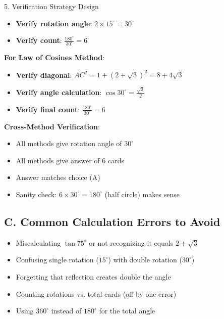 \documentclass[12pt]{article}
\begin{document}
\begin{verificationbox}{5. Verification Strategy Design}
\begin{itemize}
    \item \textbf{Verify rotation angle}: $2 \times 15^\circ = 30^\circ$ \checkmark
    
    \item \textbf{Verify count}: $\frac{180^\circ}{30^\circ} = 6$ \checkmark
\end{itemize}

\textbf{For Law of Cosines Method}:
\begin{itemize}
    \item \textbf{Verify diagonal}: $AC^2 = 1 + (2+\sqrt{3})^2 = 8 + 4\sqrt{3}$ \checkmark
    
    \item \textbf{Verify angle calculation}: $\cos 30^\circ = \frac{\sqrt{3}}{2}$ \checkmark
    
    \item \textbf{Verify final count}: $\frac{180^\circ}{30^\circ} = 6$ \checkmark
\end{itemize}

\textbf{Cross-Method Verification}:
\begin{itemize}
    \item All methods give rotation angle of $30^\circ$ \checkmark
    \item All methods give answer of 6 cards \checkmark
    \item Answer matches choice (A) \checkmark
    \item Sanity check: $6 \times 30^\circ = 180^\circ$ (half circle) makes sense \checkmark
\end{itemize}

\subsection*{C. Common Calculation Errors to Avoid}
\begin{itemize}[leftmargin=*]
    \item Miscalculating $\tan 75^\circ$ or not recognizing it equals $2+\sqrt{3}$
    \item Confusing single rotation ($15^\circ$) with double rotation ($30^\circ$)
    \item Forgetting that reflection creates double the angle
    \item Counting rotations vs. total cards (off by one error)
    \item Using $360^\circ$ instead of $180^\circ$ for the total angle
\end{itemize}

\end{verificationbox}
\end{document}
